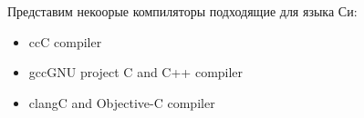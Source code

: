 Представим некоорые компиляторы подходящие для языка Си:

\begin{itemize}
		
	\item
	\begin{myenv}{cc}{C compiler}
	\end{myenv}
			
	\item
	\begin{myenv}{gcc}{GNU project C and C++ compiler}
	\end{myenv}
			
	\item
	\begin{myenv}{clang}{C and Objective-C compiler}
	\end{myenv}
			
\end{itemize}